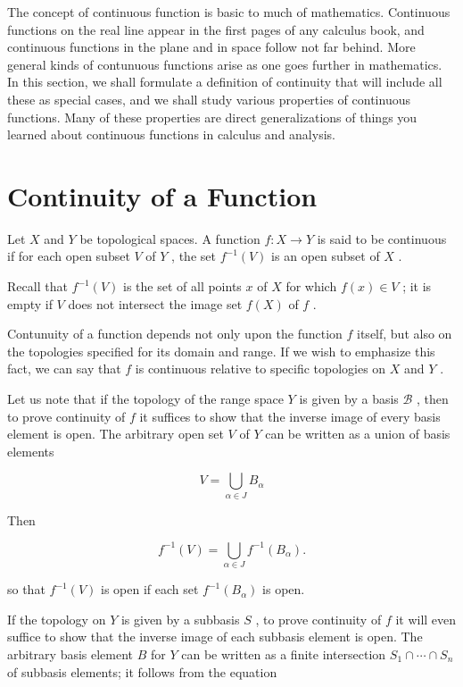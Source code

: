 \documentclass[10pt]{article}
\begin{document}
The concept of continuous function is basic to much of mathematics. Continuous functions on the real line appear in the first pages of any calculus book, and continuous functions in the plane and in space follow not far behind. More general kinds of contunuous functions arise as one goes further in mathematics. In this section, we shall formulate a definition of continuity that will include all these as special cases, and we shall study various properties of continuous functions. Many of these properties are direct generalizations of things you learned about continuous functions in calculus and analysis.

\section*{Continuity of a Function}

Let \(X\) and \(Y\) be topological spaces. A function \(f : X \rightarrow  Y\) is said to be continuous if for each open subset \(V\) of \(Y\) , the set \({f}^{-1}\left( V\right)\) is an open subset of \(X\) .

Recall that \({f}^{-1}\left( V\right)\) is the set of all points \(x\) of \(X\) for which \(f\left( x\right)  \in  V\) ; it is empty if \(V\) does not intersect the image set \(f\left( X\right)\) of \(f\) .

Contunuity of a function depends not only upon the function \(f\) itself, but also on the topologies specified for its domain and range. If we wish to emphasize this fact, we can say that \(f\) is continuous relative to specific topologies on \(X\) and \(Y\) .

Let us note that if the topology of the range space \(Y\) is given by a basis \(\mathcal{B}\) , then to prove continuity of \(f\) it suffices to show that the inverse image of every basis element is open. The arbitrary open set \(V\) of \(Y\) can be written as a union of basis elements

\[
V = \mathop{\bigcup }\limits_{{\alpha  \in  J}}{B}_{\alpha }
\]

Then

\[
{f}^{-1}\left( V\right)  = \mathop{\bigcup }\limits_{{\alpha  \in  J}}{f}^{-1}\left( {B}_{\alpha }\right) .
\]

so that \({f}^{-1}\left( V\right)\) is open if each set \({f}^{-1}\left( {B}_{\alpha }\right)\) is open.

If the topology on \(Y\) is given by a subbasis \(S\) , to prove continuity of \(f\) it will even suffice to show that the inverse image of each subbasis element is open. The arbitrary basis element \(B\) for \(Y\) can be written as a finite intersection \({S}_{1} \cap  \cdots  \cap  {S}_{n}\) of subbasis elements; it follows from the equation
\end{document}
